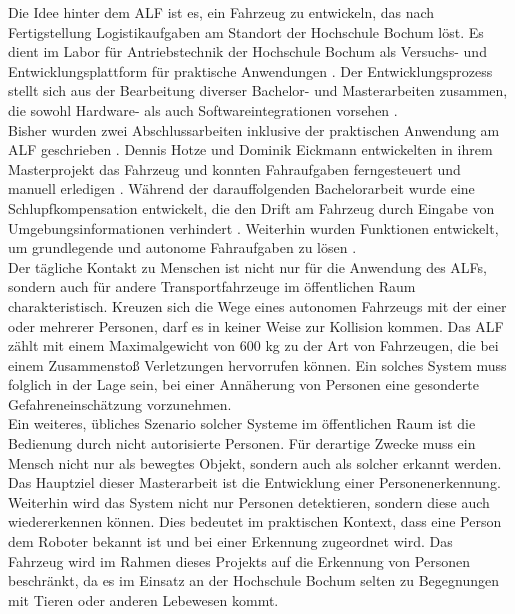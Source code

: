 		Die Idee hinter dem ALF ist es, ein Fahrzeug zu entwickeln, das nach Fertigstellung Logistikaufgaben am Standort der Hochschule Bochum löst. Es dient im Labor für Antriebstechnik der Hochschule Bochum als Versuchs- und Entwicklungsplattform für praktische Anwendungen \cite{Bachelorarbeit}. Der Entwicklungsprozess stellt sich aus der Bearbeitung diverser Bachelor- und Masterarbeiten zusammen, die sowohl Hardware- als auch Softwareintegrationen vorsehen \cite{Bachelorarbeit}.\\
		
		Bisher wurden zwei Abschlussarbeiten inklusive der praktischen Anwendung am ALF geschrieben \cite{alf, Bachelorarbeit}. Dennis Hotze und Dominik Eickmann entwickelten in ihrem Masterprojekt das Fahrzeug und konnten Fahraufgaben ferngesteuert und manuell erledigen \cite{alf}. Während der darauffolgenden Bachelorarbeit wurde eine Schlupfkompensation entwickelt, die den Drift am Fahrzeug durch Eingabe von Umgebungsinformationen verhindert \cite{Bachelorarbeit}. Weiterhin wurden Funktionen entwickelt, um grundlegende und autonome Fahraufgaben zu lösen \cite{Bachelorarbeit}.\\
		
		Der tägliche Kontakt zu Menschen ist nicht nur für die Anwendung des ALFs, sondern auch für andere Transportfahrzeuge im öffentlichen Raum charakteristisch. Kreuzen sich die Wege eines autonomen Fahrzeugs mit der einer oder mehrerer Personen, darf es in keiner Weise zur Kollision kommen. Das ALF zählt mit einem Maximalgewicht von 600 kg zu der Art von Fahrzeugen, die bei einem Zusammenstoß Verletzungen hervorrufen können. Ein solches System muss folglich in der Lage sein, bei einer Annäherung von Personen eine gesonderte Gefahreneinschätzung vorzunehmen.\\
				
		Ein weiteres, übliches Szenario solcher Systeme im öffentlichen Raum ist die Bedienung durch nicht autorisierte Personen. Für derartige Zwecke muss ein Mensch nicht nur als bewegtes Objekt, sondern auch als solcher erkannt werden. Das Hauptziel dieser Masterarbeit ist die Entwicklung einer Personenerkennung.\\
		
		Weiterhin wird das System nicht nur Personen detektieren, sondern diese auch wiedererkennen können. Dies bedeutet im praktischen Kontext, dass eine Person dem Roboter bekannt ist und bei einer Erkennung zugeordnet wird. Das Fahrzeug wird im Rahmen dieses Projekts auf die Erkennung von Personen beschränkt, da es im Einsatz an der Hochschule Bochum selten zu Begegnungen mit Tieren oder anderen Lebewesen kommt.\\
				
